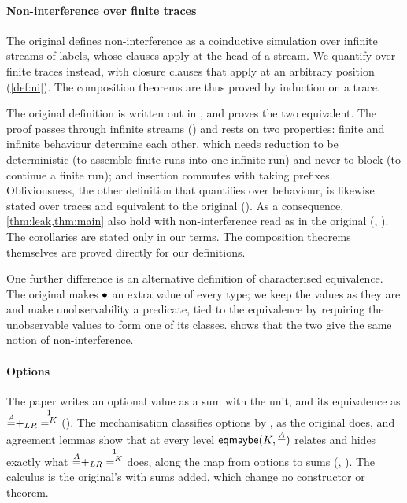 \paragraph{Non-interference over finite traces} The original
defines non-interference as a coinductive simulation over infinite streams of
labels, whose clauses apply at the head of a stream. We quantify over finite traces
instead, with closure clauses that apply at an arbitrary position (\cref{def:ni}).
The composition theorems are thus proved by induction on a trace.

The original definition is written out in ,
and  proves the two equivalent. The proof passes through infinite
streams () and rests on two properties: finite and infinite behaviour
determine each other, which needs reduction to be deterministic (to assemble
finite runs into one infinite run) and never to block (to continue a finite run);
and insertion commutes with taking prefixes. Obliviousness, the other definition
that quantifies over behaviour, is likewise stated over traces and equivalent to
the original (). As a consequence, \cref{thm:leak,thm:main}
also hold with non-interference read as in the original
(, ). The corollaries are
stated only in our terms. The composition theorems themselves are proved directly
for our definitions.

One further difference is an alternative definition of characterised equivalence.
The original makes $\bullet$ an extra value of every type; we keep the values as
they are and make unobservability a predicate, tied to the equivalence by requiring
the unobservable values to form one of its classes.  shows that the
two give the same notion of non-interference.

\paragraph{Options} The paper writes an optional value as a sum with the unit, and
its equivalence as $\eqo{A} +_{LR} \one^K$ (). The mechanisation
classifies options by , as the original does, and agreement lemmas show
that at every level $\mathsf{eqmaybe}(K,\overset{A}{=})$ relates and hides exactly what
$\eqo{A} +_{LR} \one^K$ does, along the map from options to sums
(, ). The calculus is the original's with
sums added, which change no constructor or theorem.

